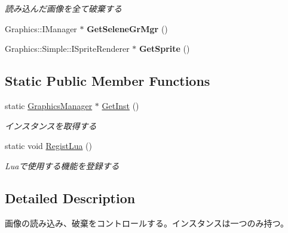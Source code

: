 \begin{DoxyCompactItemize}
\begin{DoxyCompactList}\small\item\em 読み込んだ画像を全て破棄する \end{DoxyCompactList}\item 
Graphics\+::\+I\+Manager $\ast$ {\bfseries Get\+Selene\+Gr\+Mgr} ()\hypertarget{class_graphics_manager_a2b025fce8ae30d8348ee5808b003c059}{}\label{class_graphics_manager_a2b025fce8ae30d8348ee5808b003c059}

\item 
Graphics\+::\+Simple\+::\+I\+Sprite\+Renderer $\ast$ {\bfseries Get\+Sprite} ()\hypertarget{class_graphics_manager_a72ab812dcc17d07a03a094e943ae3d2a}{}\label{class_graphics_manager_a72ab812dcc17d07a03a094e943ae3d2a}

\end{DoxyCompactItemize}
\subsection*{Static Public Member Functions}
\begin{DoxyCompactItemize}
\item 
static \hyperlink{class_graphics_manager}{Graphics\+Manager} $\ast$ \hyperlink{class_graphics_manager_a09b2f99634be4c527cd1f0071e9760df}{Get\+Inst} ()\hypertarget{class_graphics_manager_a09b2f99634be4c527cd1f0071e9760df}{}\label{class_graphics_manager_a09b2f99634be4c527cd1f0071e9760df}

\begin{DoxyCompactList}\small\item\em インスタンスを取得する \end{DoxyCompactList}\item 
static void \hyperlink{class_graphics_manager_ac4260b1d9469a88564ad948cdaca9d21}{Regist\+Lua} ()\hypertarget{class_graphics_manager_ac4260b1d9469a88564ad948cdaca9d21}{}\label{class_graphics_manager_ac4260b1d9469a88564ad948cdaca9d21}

\begin{DoxyCompactList}\small\item\em Luaで使用する機能を登録する \end{DoxyCompactList}\end{DoxyCompactItemize}


\subsection{Detailed Description}
画像の読み込み、破棄をコントロールする。インスタンスは一つのみ持つ。 

